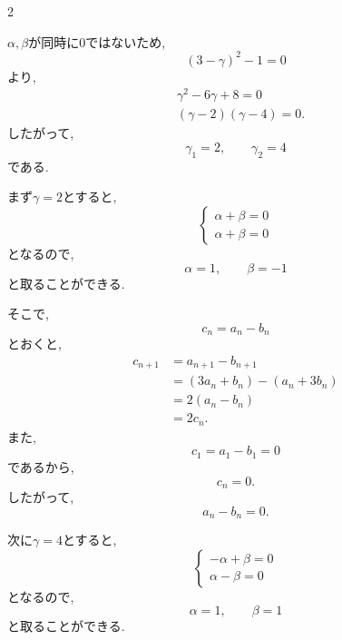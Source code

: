 \documentclass[dvipdfmx,a4paper,11pt,fleqn,openany]{jsbook}
\begin{document}
\begin{multicols*}{2}
\begin{enumerate}[label=(\arabic*),parsep=3pt]
\begin{enumerate}
                    $\alpha,\beta$が同時に$0$ではないため,
                    \[
                      (3-\gamma)^2-1=0
                    \]
                    より,
                    \begin{align*}
                      &\gamma^2-6\gamma+8=0\\
                      &(\gamma-2)(\gamma-4)=0.
                    \end{align*}
                    したがって,
                    \[
                      \gamma_1=2,\qquad\gamma_2=4
                    \]
                    である.

                    まず$\gamma=2$とすると,
                    \[
                    \begin{cases}
                      \alpha+\beta=0\\
                      \alpha+\beta=0
                    \end{cases}
                    \]
                    となるので,
                    \[
                      \alpha=1,\qquad\beta=-1
                    \]
                    と取ることができる.

                    そこで,
                    \[
                      c_n=a_n-b_n
                    \]
                    とおくと,
                    \begin{align*}
                      c_{n+1}
                        &=a_{n+1}-b_{n+1}\\
                        &=(3a_n+b_n)-(a_n+3b_n)\\
                        &=2(a_n-b_n)\\
                        &=2c_n.
                    \end{align*}
                    また,
                    \[
                      c_1=a_1-b_1=0
                    \]
                    であるから,
                    \[
                      c_n=0.
                    \]
                    したがって,
                    \[
                      a_n-b_n=0.
                    \]

                    次に$\gamma=4$とすると,
                    \[
                    \begin{cases}
                      -\alpha+\beta=0\\
                      \alpha-\beta=0
                    \end{cases}
                    \]
                    となるので,
                    \[
                      \alpha=1,\qquad\beta=1
                    \]
                    と取ることができる.


\end{enumerate}
\end{enumerate}
\end{multicols*}
\end{document}
